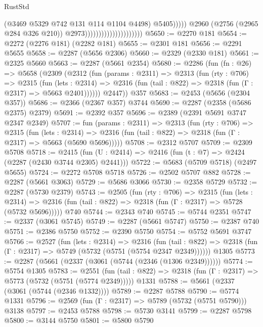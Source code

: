 \begin{lexlean}{RustStd}
\begin{coremodule}
                                                        (@3469 @5329 @742 @131 @114 @1104 @4498)
                                                        @5405)))))
                                              @2960
                                              (@2756 (@2965 @284 @326 @210))
                                              @2973)))))))))))))))))))))
@5650 := @2270 @181
@5654 := @2272 (@2276 @181) (@2282 @181)
@5655 := @2301 @181
@5656 := @2291 @5655
@5658 := @2287 (@5656 @2306)
@5660 := @2329 (@2330 @181)
@5661 := @2325 @5660
@5663 := @2287 (@5661 @2354)
@5680 := @2286
    (fun (fn : @26) =>
    @5658
      (@2309
        (@2312
          (fun (params : @2311) =>
          @2313
            (fun (rty : @706) =>
            @2315
              (fun (lets : @2314) =>
              @2316 (fun (tail : @822) => @2318 (fun (Γ : @2317) => @5663 @2401))))))
        @2447))
    @357
@5683 := @2453 (@5656 (@2304 @357))
@5686 := @2366 (@2367 @357) @3744
@5690 := @2287 (@2358 (@5686 @2375) @2379)
@5691 := @2392 @357
@5696 := @2389 (@2391 @5691 @3747 @2347 @2349)
@5707 := fun (params : @2311) =>
  @2313
    (fun (rty : @706) =>
    @2315
      (fun (lets : @2314) =>
      @2316 (fun (tail : @822) => @2318 (fun (Γ : @2317) => @5663 (@5690 @5696)))))
@5708 := @2312 @5707
@5709 := @2309 @5708
@5718 := @2415 (fun (U : @2414) => @2416 (fun (t : @7) => @2424 (@2287 (@2430 @3744 @2305) @2441)))
@5722 := @5683 (@5709 @5718) (@2497 @5655)
@5724 := @2272 @5708 @5718
@5726 := @2502 @5707 @882
@5728 := @2287 (@5661 @3063)
@5729 := @5686 @3066
@5730 := @2358 @5729
@5732 := @2287 (@5730 @2379)
@5743 := @2505
    (fun (rty : @706) =>
    @2315
      (fun (lets : @2314) =>
      @2316 (fun (tail : @822) => @2318 (fun (Γ : @2317) => @5728 (@5732 @5696)))))
    @740
@5744 := @2343 @740
@5745 := @5744 @2351
@5747 := @2337 (@3061 @5745)
@5749 := @2287 (@5661 @5747)
@5750 := @2387 @740
@5751 := @2386 @5750
@5752 := @2390 @5750
@5754 := @5752 @5691 @3747
@5766 := @2527
    (fun (lets : @2314) =>
    @2316
      (fun (tail : @822) => @2318 (fun (Γ : @2317) => @5749 (@5732 (@5751 (@5754 @2347 @2349))))))
    @1305
@5773 := @2287 (@5661 (@2337 (@3061 (@5744 (@2346 (@1306 @2349))))))
@5774 := @5754 @1305
@5783 := @2551
    (fun (tail : @822) => @2318 (fun (Γ : @2317) => @5773 (@5732 (@5751 (@5774 @2349)))))
    @1331
@5788 := @5661 (@2337 (@3061 (@5744 (@2346 @1332))))
@5789 := @2287 @5788
@5790 := @5774 @1331
@5796 := @2569 (fun (Γ : @2317) => @5789 (@5732 (@5751 @5790))) @3138
@5797 := @2453 @5788
@5798 := @5730 @3141
@5799 := @2287 @5798
@5800 := @3144 @5750
@5801 := @5800 @5790

\end{coremodule}
\end{lexlean}
